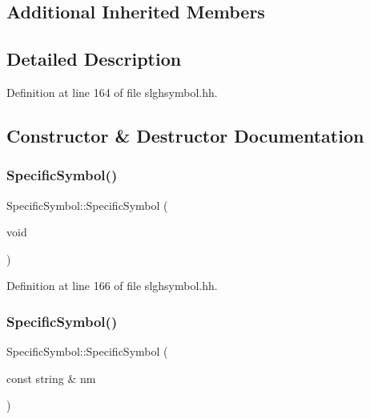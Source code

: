 \subsection*{Additional Inherited Members}


\subsection{Detailed Description}


Definition at line 164 of file slghsymbol.\+hh.



\subsection{Constructor \& Destructor Documentation}
\mbox{\label{class_specific_symbol_af9ee35d124eb5679ef3be43f6a496999}} 
\subsubsection{\texorpdfstring{SpecificSymbol()}{SpecificSymbol()}\hspace{0.1cm}{\footnotesize\ttfamily [1/2]}}
{\footnotesize\ttfamily Specific\+Symbol\+::\+Specific\+Symbol (\begin{DoxyParamCaption}\item[{void}]{ }\end{DoxyParamCaption})\hspace{0.3cm}{\ttfamily [inline]}}



Definition at line 166 of file slghsymbol.\+hh.

\mbox{\label{class_specific_symbol_a300a873285c9aba14cd67ed55a3baea4}} 
\subsubsection{\texorpdfstring{SpecificSymbol()}{SpecificSymbol()}\hspace{0.1cm}{\footnotesize\ttfamily [2/2]}}
{\footnotesize\ttfamily Specific\+Symbol\+::\+Specific\+Symbol (\begin{DoxyParamCaption}\item[{const string \&}]{nm }\end{DoxyParamCaption})\hspace{0.3cm}{\ttfamily [inline]}}



